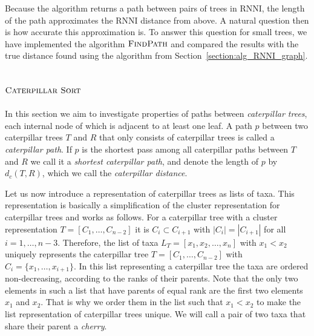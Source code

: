 \documentclass{amsart}
\newcommand{\rnni}{\mathrm{RNNI}}
\newcommand{\csort}{\textsc{Caterpillar Sort}}
\newcommand{\findpath}{\textsc{FindPath}}
\begin{document}
Because the algorithm returns a path between pairs of trees in $\rnni$, the length of the path approximates the $\rnni$ distance from above.
A natural question then is how accurate this approximation is.
To answer this question for small trees, we have implemented the algorithm $\findpath$
\autocite{}
and compared the results with the true distance found using the algorithm from Section~\ref{section:alg_RNNI_graph}.


\subsection{$\csort$}
\label{section:alg_csort}

In this section we aim to investigate properties of paths between \emph{caterpillar trees}, each internal node of which is adjacent to at least one leaf.
A path $p$ between two caterpillar trees $T$ and $R$ that only consists of caterpillar trees is called a \emph{caterpillar path}.
If $p$ is the shortest pass among all caterpillar paths between $T$ and $R$ we call it a \emph{shortest caterpillar path}, and denote the length of $p$ by $d_c(T,R)$, which we call the \emph{caterpillar distance}.

Let us now introduce a representation of caterpillar trees as lists of taxa.
This representation is basically a simplification of the cluster representation for caterpillar trees and works as follows.
For a caterpillar tree with a cluster representation $T = [C_1, \ldots, C_{n-2}]$ it is $C_i \subset C_{i+1}$ with $|C_i| = |C_{i+1}|$ for all $i = 1, \ldots, n-3$.
Therefore, the list of taxa $L_T = [x_1, x_2, \ldots, x_n]$ with $x_1<x_2$ uniquely represents the caterpillar tree $T = [C_1, \ldots, C_{n-2}]$ with $C_i = \{x_1, \ldots, x_{i+1}\}$.
In this list representing a caterpillar tree the taxa are ordered non-decreasing, according to the ranks of their parents.
Note that the only two elements in such a list that have parents of equal rank are the first two elements $x_1$ and $x_2$.
That is why we order them in the list such that
$x_1 < x_2$
to make the list representation of caterpillar trees unique.
We will call a pair of two taxa that share their parent a \emph{cherry}.
\end{document}
